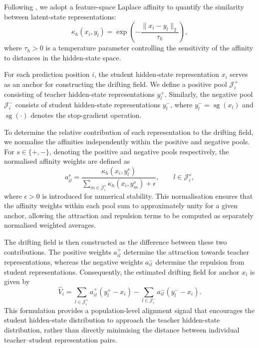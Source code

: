 \documentclass{article}
\begin{document}
Following \citet{deng2026drifting}, we adopt a feature-space Laplace affinity to quantify the similarity between latent-state representations:
\begin{equation}
 \kappa_h(x_i,y_l)=\exp\!\left(-\frac{\|x_i-y_l\|_2}{\tau_h}\right),
\end{equation}
where $\tau_h>0$ is a temperature parameter controlling the sensitivity of the affinity to distances in the hidden-state space.

For each prediction position $i$, the student hidden-state representation $x_i$ serves as an anchor for constructing the drifting field. We define a positive pool $\mathcal J_i^+$ consisting of teacher hidden-state representations $y_l^+$. Similarly, the negative pool $\mathcal J_i^-$ consists of student hidden-state representations $y_l^-$, where $y_l^-=\operatorname{sg}(x_l)$ and $\operatorname{sg}(\cdot)$ denotes the stop-gradient operation.

To determine the relative contribution of each representation to the drifting field, we normalise the affinities independently within the positive and negative pools. For $s\in\{+,-\}$, denoting the positive and negative pools respectively, the normalised affinity weights are defined as
\begin{equation}
 a^s_{il}=\frac{\kappa_h(x_i,y_l^s)}
 {\sum_{m\in\mathcal J_i^s}\kappa_h(x_i,y_m^s)+\epsilon},
 \qquad l\in\mathcal J_i^s,
\end{equation}
where $\epsilon>0$ is introduced for numerical stability. This normalisation ensures that the affinity weights within each pool sum to approximately unity for a given anchor, allowing the attraction and repulsion terms to be computed as separately normalised weighted averages.

The drifting field is then constructed as the difference between these two contributions. The positive weights $a^+_{il}$ determine the attraction towards teacher representations, whereas the negative weights $a^-_{il}$ determine the repulsion from student representations. Consequently, the estimated drifting field for anchor $x_i$ is given by
\begin{equation}\label{drift_pos_neg}
 \widehat V_i=\sum_{l\in\mathcal J_i^+}a^+_{il}(y_l^+-x_i)
 -\sum_{l\in\mathcal J_i^-}a^-_{il}(y_l^--x_i).
\end{equation}
This formulation provides a population-level alignment signal that encourages the student hidden-state distribution to approach the teacher hidden-state distribution, rather than directly minimising the distance between individual teacher--student representation pairs.
\end{document}
